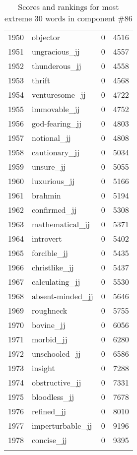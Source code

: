 \begin{longtable}[!htbp]{| rlr@{.}l |}
    1950 & objector & 0 & 4516 \\
    1951 & ungracious\_jj & 0 & 4557 \\
    1952 & thunderous\_jj & 0 & 4558 \\
    1953 & thrift & 0 & 4568 \\
    1954 & venturesome\_jj & 0 & 4722 \\
    1955 & immovable\_jj & 0 & 4752 \\
    1956 & god-fearing\_jj & 0 & 4803 \\
    1957 & notional\_jj & 0 & 4808 \\
    1958 & cautionary\_jj & 0 & 5034 \\
    1959 & unsure\_jj & 0 & 5055 \\
    1960 & luxurious\_jj & 0 & 5166 \\
    1961 & brahmin & 0 & 5194 \\
    1962 & confirmed\_jj & 0 & 5308 \\
    1963 & mathematical\_jj & 0 & 5371 \\
    1964 & introvert & 0 & 5402 \\
    1965 & forcible\_jj & 0 & 5435 \\
    1966 & christlike\_jj & 0 & 5437 \\
    1967 & calculating\_jj & 0 & 5530 \\
    1968 & absent-minded\_jj & 0 & 5646 \\
    1969 & roughneck & 0 & 5755 \\
    1970 & bovine\_jj & 0 & 6056 \\
    1971 & morbid\_jj & 0 & 6280 \\
    1972 & unschooled\_jj & 0 & 6586 \\
    1973 & insight & 0 & 7288 \\
    1974 & obstructive\_jj & 0 & 7331 \\
    1975 & bloodless\_jj & 0 & 7678 \\
    1976 & refined\_jj & 0 & 8010 \\
    1977 & imperturbable\_jj & 0 & 9196 \\
    1978 & concise\_jj & 0 & 9395 \\
    \hline
    \caption{Scores and rankings for most extreme 30 words in component \#86} \\
\end{longtable}
